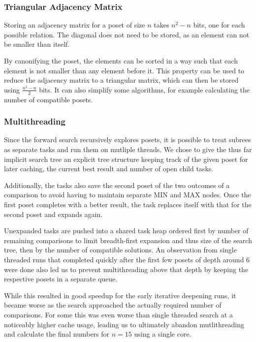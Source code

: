 \documentclass[10pt,journal,compsoc]{IEEEtran}
\begin{document}
\subsubsection{Triangular Adjacency Matrix}
Storing an adjacency matrix for a poset of size $n$ takes $n^2 - n$ bits, one for each possible relation.
The diagonal does not need to be stored, as an element can not be smaller than itself.

By canonifying the poset, the elements can be sorted in a way such that each element is not smaller than any element before it.
This property can be used to reduce the adjacency matrix to a triangular matrix, which can then be stored using $\frac{n^2 - n}{2}$ bits.
It can also simplify some algorithms, for example calculating the number of compatible posets.

\subsubsection{Multithreading}

Since the forward search recursively explores posets, it is possible to
treat subrees as separate tasks and run them on mutliple threads.
We chose to give the thus far implicit search tree an explicit
tree structure keeping track of the given poset for later caching,
the current best result and number of open child tasks.

Additionally, the tasks also save the second poset of the two
outcomes of a comparison to avoid having to maintain separate
MIN and MAX nodes. Once the first poset completes with a better result,
the task replaces itself with that for the second poset and expands 
again.

Unexpanded tasks are pushed into a shared task heap ordered first by
number of remaining comparisons to limit breadth-first expansion and
thus size of the search tree, then by the number of compatible solutions.
An observation from single threaded runs that completed quickly after 
the first few posets of depth around $6$ were done also led us to 
prevent multithreading above that depth by keeping the respective posets
in a separate queue.

While this resulted in good speedup for the early iterative deepening
runs, it became worse as the search approached the actually required
number of comparisons. For some this was even worse than single
threaded search at a noticeably higher cache usage, leading us to
ultimately abandon mutlithreading and calculate the final numbers
for $n=15$ using a single core.
\end{document}
